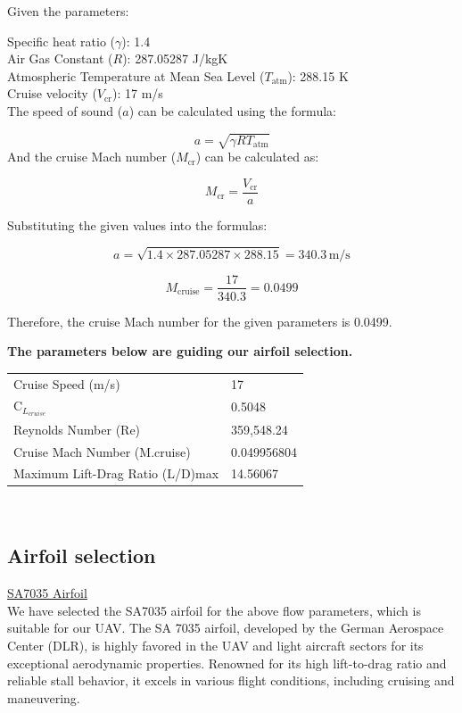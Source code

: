 \documentclass[12 pt]{article}
\begin{document}
\begin{itemize}
Given the parameters:

 Specific heat ratio (\( \gamma \)): 1.4\\
 Air Gas Constant (\( R \)): 287.05287 J/kgK\\
 Atmospheric Temperature at Mean Sea Level (\( T_{\text{atm}} \)): 288.15 K\\
 Cruise velocity (\( V_{\text{cr}} \)): 17 m/s\\

The speed of sound (\( a \)) can be calculated using the formula:

\[
a = \sqrt{\gamma R T_{\text{atm}}} \tag{6.4}
\]
And the cruise Mach number (\( M_{\text{cr}} \)) can be calculated as:

\[
M_{\text{cr}} = \frac{V_{\text{cr}}}{a} \tag{6.5}
\]

Substituting the given values into the formulas:

\[
a = \sqrt{1.4 \times 287.05287 \times 288.15}  = 340.3 \, \text{m/s}
\]

\[
M_{\text{cruise}} = \frac{17}{340.3} = 0.0499 \tag{6.6}
\]

Therefore, the cruise Mach number for the given parameters is  0.0499.
\end{itemize}
\color{black}
\textbf{ \large The parameters below are guiding our airfoil selection.}
\begin{table}[h]
\centering
\begin{tabular}{ll}
\hline
Cruise Speed (m/s) & 17 \\
$ \text{C}_{{L}_{cruise}} $ & 0.5048 \\
Reynolds Number (Re) & 359,548.24 \\
Cruise Mach Number (M.cruise) & 0.049956804 \\
Maximum Lift-Drag Ratio (L/D)max & 14.56067 \\
\hline
\end{tabular}
\end{table}\\
\color{red}
\subsection{ Airfoil selection}

 \large \underline{SA7035 Airfoil}\\
\color{black}
We have selected the SA7035 airfoil for the above flow parameters, which is suitable for our UAV. The SA 7035 airfoil, developed by the German Aerospace Center (DLR), is highly favored in the UAV and light aircraft sectors for its exceptional aerodynamic properties. Renowned for its high lift-to-drag ratio and reliable stall behavior, it excels in various flight conditions, including cruising and maneuvering.
\end{document}
